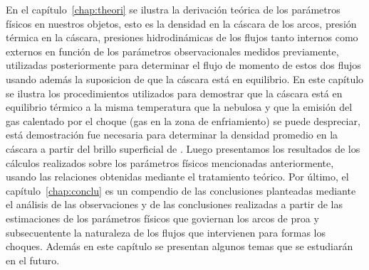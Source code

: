 En el capítulo~\ref{chap:theori} se ilustra la derivación teórica de los parámetros físicos en nuestros objetos, esto es la densidad en la cáscara de los arcos, presión térmica en la cáscara, presiones hidrodinámicas de los flujos tanto internos como externos en función de los parámetros observacionales medidos previamente, utilizadas posteriormente para determinar el flujo de momento de estos dos flujos usando además la suposicion de que la cáscara está en equilibrio. En este capítulo se ilustra los procedimientos utilizados para demostrar que la cáscara está en equilibrio térmico a la misma temperatura que la nebulosa y que la emisión del gas calentado por el choque (gas en la zona de enfriamiento) se puede despreciar, está demostración fue necesaria para determinar la densidad promedio en la cáscara a partir del brillo superficial de \ha{}. Luego  presentamos los resultados de los cálculos realizados sobre los parámetros físicos mencionadas anteriormente, usando las relaciones obtenidas mediante el tratamiento teórico. Por último, el capítulo~\ref{chap:conclu} es un compendio de las conclusiones planteadas mediante el análisis de las observaciones y de las conclusiones realizadas a partir de las  estimaciones de los parámetros físicos que goviernan los arcos de proa y subsecuentente la naturaleza de los flujos que intervienen para formas los choques. Además en este capítulo se presentan algunos temas que se estudiarán en el futuro.  

% 

% 
